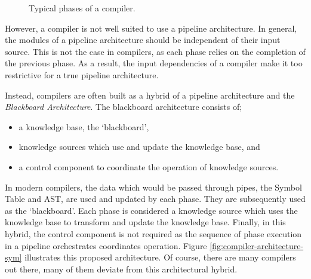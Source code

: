 \begin{figure}[H]
    \centering
{}
\caption{Typical phases of a compiler.}
\label{fig:compiler-architecture}
\end{figure}

However, a compiler is not well suited to use a pipeline architecture.
In general, the modules of a pipeline architecture should be independent of their input source.
This is not the case in compilers, as each phase relies on the completion of the previous phase.
As a result, the input dependencies of a compiler make it too restrictive for a true pipeline architecture.

Instead, compilers are often built as a hybrid of a pipeline architecture and the \textsl{Blackboard Architecture}.
The blackboard architecture consists of;
\begin{itemize}
    \item a knowledge base, the `blackboard',
    \item knowledge sources which use and update the knowledge base, and
    \item a control component to coordinate the operation of knowledge sources.
\end{itemize}

In modern compilers, the data which would be passed through pipes, the Symbol Table and AST,
are used and updated by each phase.
They are subsequently used as the `blackboard'.
Each phase is considered a knowledge source which uses the knowledge base to transform and update the knowledge base.
Finally, in this hybrid, the control component is not required as the sequence of phase execution in a pipeline orchestrates coordinates operation.
Figure \ref{fig:compiler-architecture-sym} illustrates this proposed architecture.
Of course, there are many compilers out there, many of them deviate from this architectural hybrid.

